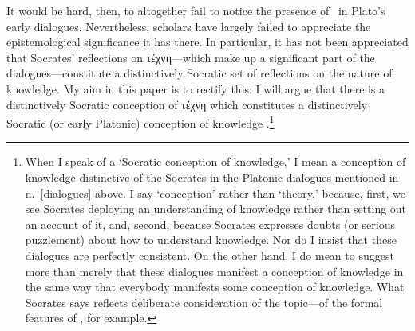 \documentclass[11pt,letterpaper,oneside]{amsart} %
\begin{document}



It would be hard, then, to altogether fail to notice the presence of \techne\ in Plato's early dialogues. Nevertheless, scholars have largely failed to appreciate the epistemological significance it has there. In particular, it has not been appreciated that Socrates' reflections on τέχνη---which make up a significant part of the dialogues---constitute a distinctively Socratic set of reflections on the nature of knowledge. My aim in this paper is to rectify this: I will argue that there is a distinctively Socratic conception of τέχνη which constitutes a distinctively Socratic (or early Platonic) conception of knowledge .\footnote{When I speak of a `Socratic conception of knowledge,' I mean a conception of knowledge distinctive of the Socrates in the Platonic dialogues mentioned in n.\ \ref{dialogues} above. I say `conception' rather than `theory,' because, first, we see Socrates deploying an understanding of knowledge rather than setting out an account of it, and, second, because Socrates expresses doubts (or serious puzzlement) about how to understand knowledge. Nor do I insist that these dialogues are perfectly consistent. On the other hand, I do mean to suggest more than merely that these dialogues manifest a conception of knowledge in the same way that everybody manifests some conception of knowledge. What Socrates says reflects deliberate consideration of the topic---of the formal features of \techne, for example.}
\end{document}

